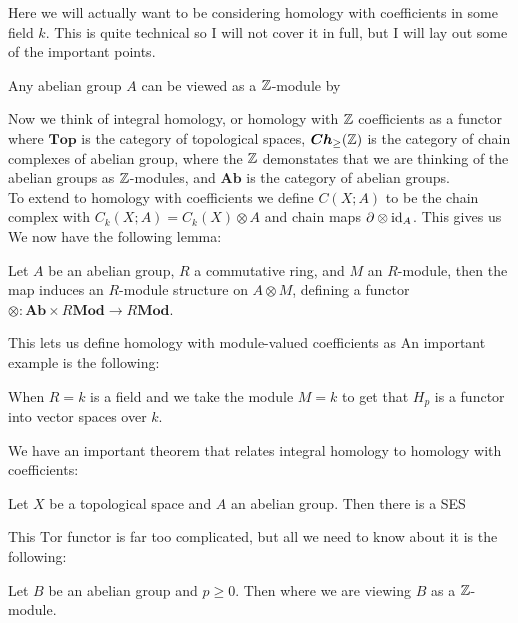 \documentclass{article}
\begin{document}
\begin{aside}
Here we will actually want to be considering homology with coefficients in some field $k$. This is quite technical so I will not cover it in full, but I will lay out some of the important points. 
\begin{lemma}
	Any abelian group $A$ can be viewed as a $\mathbb{Z}$-module by 
\end{lemma}
Now we think of integral homology, or homology with $\mathbb{Z}$ coefficients as a functor 
where $\bm{Top}$ is the category of topological spaces, $\bm{Ch}_{\geq}(\mathbb{Z})$ is the category of chain complexes of abelian group, where the $\mathbb{Z}$ demonstates that we are thinking of the abelian groups as $\mathbb{Z}$-modules, and $\bm{Ab}$ is the category of abelian groups. \\
To extend to homology with coefficients we define $C(X;A)$ to be the chain complex with $C_k(X;A) = C_k(X) \otimes A$ and chain maps $\partial \otimes \operatorname{id}_A$. This gives us 
We now have the following lemma:
\begin{lemma}
	Let $A$ be an abelian group, $R$ a commutative ring, and $M$ an $R$-module, then the map 
induces an $R$-module structure on $A\otimes M$, defining a functor $\otimes : \bm{Ab} \times R\bm{Mod} \to R\bm{Mod}$.
\end{lemma}
This lets us define homology with module-valued coefficients as 
An important example is the following:
\begin{example}
	 When $R=k$ is a field and we take the module $M=k$ to get that $H_p$ is a functor into vector spaces over $k$.
	\end{example}
We have an important theorem that relates integral homology to homology with coefficients:
\begin{theorem}
	Let $X$ be a topological space and $A$ an abelian group. Then there is a SES
\end{theorem}
This $\text{Tor}$ functor is far too complicated, but all we need to know about it is the following:
\begin{lemma}
	Let $B$ be an abelian group and $p\geq0$. Then 
where we are viewing $B$ as a $\mathbb{Z}$-module. 
\end{lemma}


\end{aside}
\end{document}
